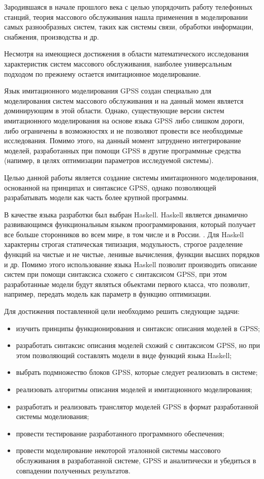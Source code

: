 \Introduction

Зародившаяся в начале прошлого века с целью упорядочить работу телефонных станций, теория массового обслуживания нашла применения в моделировании самых разнообразных систем, таких как системы связи, обработки информации, снабжения, производства и др.

Несмотря на имеющиеся достижения в области математического исследования характеристик систем массового обслуживания, наиболее универсальным подходом по прежнему остается имитационное моделирование.

Язык имитационного моделирования GPSS создан специально для моделирования систем массового обслуживания и на данный момен является доминирующим в этой области. Однако, существующие версии систем имитационного моделирования на основе языка GPSS либо слишком дороги, либо ограничены в возможностях и не позволяют провести все необходимые исследования.\cite{KST} Помимо этого, на данный момент затруднено интегрирование моделей, разработанных при помощи GPSS в другие программные средства (напимер, в целях оптимизации параметров исследуемой системы).

Целью данной работы является создание системы имитационного моделирования, основанной на принципах и синтаксисе GPSS, однако позволяющей разрабатывать модели как часть более крупной программы.

В качестве языка разработки был выбран Haskell. Haskell является динамично развивающимся функциональным языком проограммирования, который получает все больше сторонников во всем мире, в том числе и в России. \cite{HaskellRef}. Для Haskell характерны строгая статическая типизация, модульность, строгое разделение функций на чистые и не чистые, ленивые вычисления, функции высших порядков и др.\cite{Haskell} Помимо этого использование языка Haskell позволит производить описание систем при помощи синтаксиса схожего с синтаксисом GPSS, при этом разработанные модели будут являться объектами первого класса, что позволит, например, передать модель как параметр в функцию оптимизации.

Для достижения поставленной цели необходимо решить следующие задачи:
\begin{itemize}
\item изучить принципы функционирования и синтаксис описания моделей в GPSS;
\item разработать синтаксис описания моделей схожий с синтаксисом GPSS, но при этом позволяющий составлять модели в виде функций языка Haskell;
\item выбрать подмножество блоков GPSS, которые следует реализовать в системе;
\item реализовать алгоритмы описания моделей и имитационного моделирования;
\item разработать и реализовать транслятор моделей GPSS в формат разработанной системы моделиования;
\item провести тестирование разработанного программного обеспечения;
\item провести моделирование некоторой эталонной системы массового обслуживания в разработанной системе, GPSS и аналитически и убедиться в совпадении полученных результатов.
\end{itemize}

